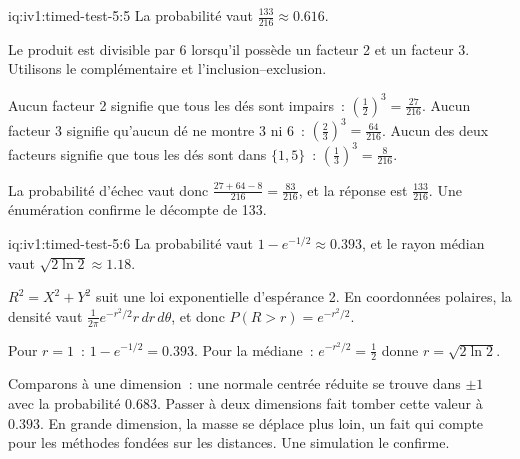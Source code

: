 \begin{solution}{iq:iv1:timed-test-5:5}
La probabilité vaut $\frac{133}{216} \approx 0.616$.

Le produit est divisible par 6 lorsqu'il possède un facteur 2 et un facteur 3. Utilisons le complémentaire et l'inclusion--exclusion.

Aucun facteur 2 signifie que tous les dés sont impairs~: $(\frac12)^3 = \frac{27}{216}$. Aucun facteur 3 signifie qu'aucun dé ne montre 3 ni 6~: $(\frac23)^3 = \frac{64}{216}$. Aucun des deux facteurs signifie que tous les dés sont dans $\{1, 5\}$~: $(\frac13)^3 = \frac{8}{216}$.

La probabilité d'échec vaut donc $\frac{27 + 64 - 8}{216} = \frac{83}{216}$, et la réponse est $\frac{133}{216}$. Une énumération confirme le décompte de 133.

\end{solution}

\begin{solution}{iq:iv1:timed-test-5:6}
La probabilité vaut $1 - e^{-1/2} \approx 0.393$, et le rayon médian vaut $\sqrt{2\ln 2} \approx 1.18$.

$R^2 = X^2 + Y^2$ suit une loi exponentielle d'espérance 2. En coordonnées polaires, la densité vaut $\frac{1}{2\pi}e^{-r^2/2}r\,dr\,d\theta$, et donc $P(R > r) = e^{-r^2/2}$.

Pour $r = 1$~: $1 - e^{-1/2} = 0.393$. Pour la médiane~: $e^{-r^2/2} = \frac12$ donne $r = \sqrt{2\ln 2}$.

Comparons à une dimension~: une normale centrée réduite se trouve dans $\pm 1$ avec la probabilité $0.683$. Passer à deux dimensions fait tomber cette valeur à $0.393$. En grande dimension, la masse se déplace plus loin, un fait qui compte pour les méthodes fondées sur les distances. Une simulation le confirme.

\end{solution}

